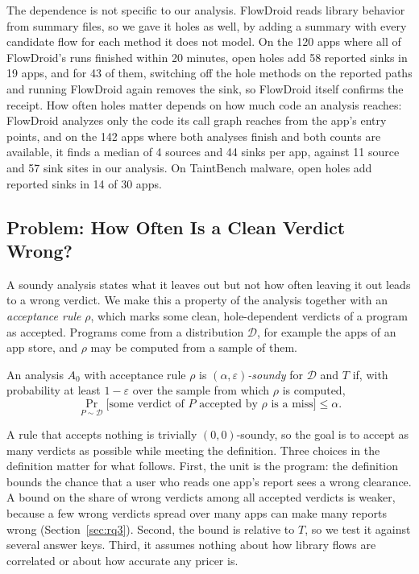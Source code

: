 The dependence is not specific to our analysis.
FlowDroid reads library behavior from summary files, so we gave it holes as well, by adding a summary with every candidate flow for each method it does not model.
On the 120 apps where all of FlowDroid's runs finished within 20 minutes, open holes add 58 reported sinks in 19 apps, and for 43 of them, switching off the hole methods on the reported paths and running FlowDroid again removes the sink, so FlowDroid itself confirms the receipt.
How often holes matter depends on how much code an analysis reaches: FlowDroid analyzes only the code its call graph reaches from the app's entry points, and on the 142 apps where both analyses finish and both counts are available, it finds a median of 4 sources and 44 sinks per app, against 11 source and 57 sink sites in our analysis.
On TaintBench malware, open holes add reported sinks in 14 of 30 apps.

\subsection{Problem: How Often Is a Clean Verdict Wrong?}
\label{sec:def}
A soundy analysis states what it leaves out but not how often leaving it out leads to a wrong verdict.
We make this a property of the analysis together with an \emph{acceptance rule} $\rho$, which marks some clean, hole-dependent verdicts of a program as accepted.
Programs come from a distribution $\mathcal{D}$, for example the apps of an app store, and $\rho$ may be computed from a sample of them.

\begin{definition}\label{def:soundy}
An analysis $A_0$ with acceptance rule $\rho$ is \emph{$(\alpha,\varepsilon)$-soundy} for $\mathcal{D}$ and $T$ if, with probability at least $1-\varepsilon$ over the sample from which $\rho$ is computed,
\[\Pr_{P\sim\mathcal{D}}\bigl[\text{some verdict of $P$ accepted by $\rho$ is a miss}\bigr]\le\alpha.\]
\end{definition}

\noindent A rule that accepts nothing is trivially $(0,0)$-soundy, so the goal is to accept as many verdicts as possible while meeting the definition.
Three choices in the definition matter for what follows.
First, the unit is the program: the definition bounds the chance that a user who reads one app's report sees a wrong clearance.
A bound on the share of wrong verdicts among all accepted verdicts is weaker, because a few wrong verdicts spread over many apps can make many reports wrong (Section~\ref{sec:rq3}).
Second, the bound is relative to $T$, so we test it against several answer keys.
Third, it assumes nothing about how library flows are correlated or about how accurate any pricer is.
